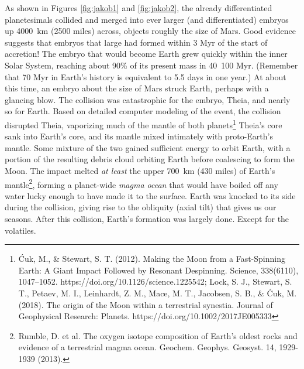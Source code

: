 \documentclass[amstex,12pt]{book}
\begin{document}
As shown in Figures \ref{fig:jakob1} and \ref{fig:jakob2}, the already differentiated planetesimals collided and merged into ever larger (and differentiated) embryos up \SI{4000}{\kilo\metre} (2500 miles) across, objects roughly the size of Mars. Good evidence suggests that embryos that large had formed within 3 Myr of the start of accretion! The embryo that would become Earth grew quickly within the inner Solar System, reaching about 90\% of its present mass in \SI{40}{100}{} Myr. (Remember that 70 Myr in Earth's history is equivalent to 5.5 days in one year.) At about this time, an embryo about the size of Mars struck Earth, perhaps with a glancing blow. The collision was catastrophic for the embryo, Theia, and nearly so for Earth. Based on detailed computer modeling of the event, the collision disrupted Theia, vaporizing much of the mantle of both planets\footnote{\'{C}uk, M., \& Stewart, S. T. (2012). Making the Moon from a Fast-Spinning Earth: A Giant Impact Followed by Resonant Despinning. Science, 338(6110), 1047–1052. https://doi.org/10.1126/science.1225542; Lock, S. J., Stewart, S. T., Petaev, M. I., Leinhardt, Z. M., Mace, M. T., Jacobsen, S. B., \& Ćuk, M. (2018). The origin of the Moon within a terrestrial synestia. Journal of Geophysical Research: Planets. https://doi.org/10.1002/2017JE005333
} Theia's core sank into Earth's core, and its mantle mixed intimately with proto-Earth's mantle. Some mixture of the two gained sufficient energy to orbit Earth, with a portion of the resulting debris cloud orbiting Earth before coalescing to form the Moon. The impact melted \textit{at least} the upper \SI{700}{\kilo\metre} (430 miles) of Earth's mantle\footnote{Rumble, D. et al. The oxygen isotope composition of Earth's oldest rocks and evidence of a terrestrial magma ocean. Geochem. Geophys. Geosyst. 14, 1929-1939 (2013).}, forming a planet-wide \emph{magma ocean} that would have boiled off any water lucky enough to have made it to the surface. Earth was knocked to its side during the collision, giving rise to the obliquity (axial tilt) that gives us our seasons. After this collision, Earth's formation was largely done. Except for the volatiles.\\
\end{document}
